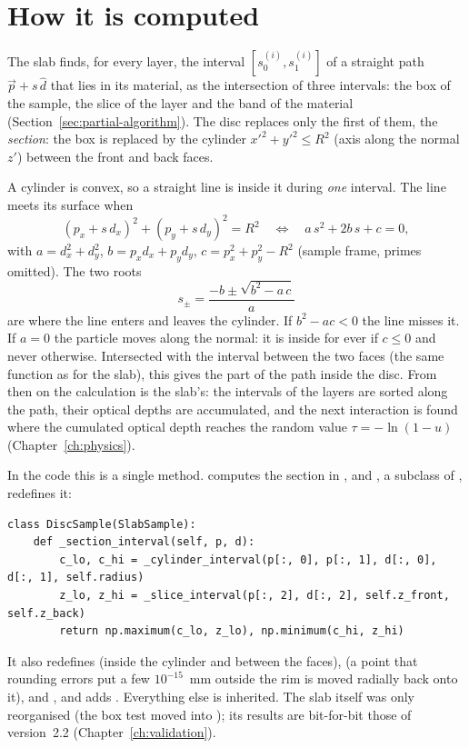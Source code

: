 \section{How it is computed}
\label{sec:disc-algorithm}

The slab finds, for every layer, the interval $[s_0^{(i)},s_1^{(i)}]$ of a straight path $\vec p + s\,\hat d$ that lies in its
material, as the intersection of three intervals: the box of the sample, the slice of the layer and the band of the material
(Section~\ref{sec:partial-algorithm}). The disc replaces only the first of them, the \emph{section}: the box is replaced by the
cylinder $x'^2+y'^2\le R^2$ (axis along the normal $z'$) between the front and back faces.

A cylinder is convex, so a straight line is inside it during \emph{one} interval. The line meets its surface when
\begin{equation}
  (p_x + s\,d_x)^2 + (p_y + s\,d_y)^2 = R^2
  \quad\Longleftrightarrow\quad
  a\,s^2 + 2b\,s + c = 0,
\end{equation}
with $a=d_x^2+d_y^2$, $b=p_xd_x+p_yd_y$, $c=p_x^2+p_y^2-R^2$ (sample frame, primes omitted). The two roots
\begin{equation}
  s_\pm = \frac{-b \pm \sqrt{b^2 - a\,c}}{a}
\end{equation}
are where the line enters and leaves the cylinder. If $b^2-ac<0$ the line misses it. If $a=0$ the particle moves along the normal:
it is inside for ever if $c\le0$ and never otherwise. Intersected with the interval between the two faces (the same function as
for the slab), this gives the part of the path inside the disc. From then on the calculation is the slab's: the intervals of
the layers are sorted along the path, their optical depths are accumulated, and the next interaction is found where the
cumulated optical depth reaches the random value $\tau=-\ln(1-u)$ (Chapter~\ref{ch:physics}).

In the code this is a single method.  computes the section in , and ,
a subclass of , redefines it:
\begin{lstlisting}
class DiscSample(SlabSample):
    def _section_interval(self, p, d):
        c_lo, c_hi = _cylinder_interval(p[:, 0], p[:, 1], d[:, 0], d[:, 1], self.radius)
        z_lo, z_hi = _slice_interval(p[:, 2], d[:, 2], self.z_front, self.z_back)
        return np.maximum(c_lo, z_lo), np.minimum(c_hi, z_hi)
\end{lstlisting}
It also redefines  (inside the cylinder and between the faces),  (a point that rounding errors
put a few $10^{-15}$~mm outside the rim is moved radially back onto it),  and , and adds
. Everything else is inherited. The slab itself was only reorganised (the box test moved into
); its results are bit-for-bit those of version~2.2 (Chapter~\ref{ch:validation}).


